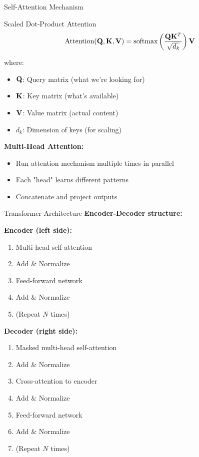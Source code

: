 \documentclass[aspectratio=169]{beamer}
\begin{document}
\begin{frame}{Self-Attention Mechanism}
  \begin{definitionbox}{Scaled Dot-Product Attention}
    \begin{equation}
      \text{Attention}(\mathbf{Q}, \mathbf{K}, \mathbf{V}) = \text{softmax}\left(\frac{\mathbf{Q}\mathbf{K}^T}{\sqrt{d_k}}\right)\mathbf{V}
    \end{equation}

    where:
    \begin{itemize}
      \item $\mathbf{Q}$: Query matrix (what we're looking for)
      \item $\mathbf{K}$: Key matrix (what's available)
      \item $\mathbf{V}$: Value matrix (actual content)
      \item $d_k$: Dimension of keys (for scaling)
    \end{itemize}
  \end{definitionbox}

  \vspace{0.5em}

  \textbf{Multi-Head Attention:}
  \begin{itemize}
    \item Run attention mechanism multiple times in parallel
    \item Each "head" learns different patterns
    \item Concatenate and project outputs
  \end{itemize}
\end{frame}

\begin{frame}{Transformer Architecture}
  \textbf{Encoder-Decoder structure:}

  \vspace{0.5em}

  \textbf{Encoder (left side):}
  \begin{enumerate}
    \item Multi-head self-attention
    \item Add \& Normalize
    \item Feed-forward network
    \item Add \& Normalize
    \item (Repeat $N$ times)
  \end{enumerate}

  \textbf{Decoder (right side):}
  \begin{enumerate}
    \item Masked multi-head self-attention
    \item Add \& Normalize
    \item Cross-attention to encoder
    \item Add \& Normalize
    \item Feed-forward network
    \item Add \& Normalize
    \item (Repeat $N$ times)
  \end{enumerate}
\end{frame}
\end{document}
